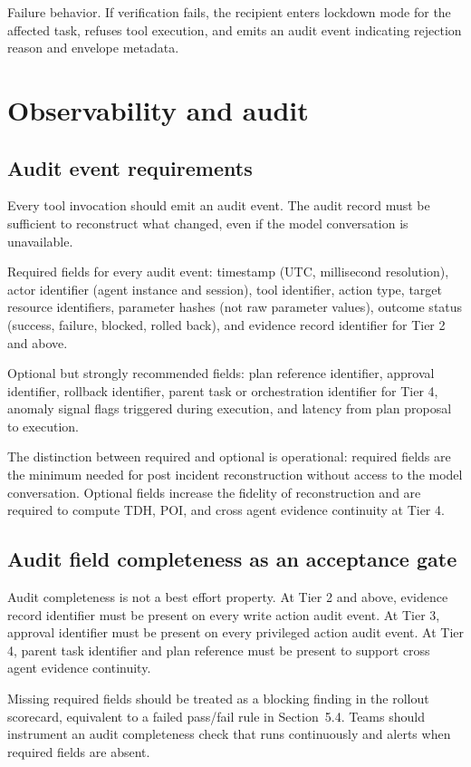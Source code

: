 \documentclass[11pt]{article}
\begin{document}
Failure behavior. If verification fails, the recipient enters lockdown mode for the affected task, refuses tool execution, and emits an audit event indicating rejection reason and envelope metadata.

\section{Observability and audit}

\subsection{Audit event requirements}
Every tool invocation should emit an audit event. The audit record must be sufficient to reconstruct what changed, even if the model conversation is unavailable.

Required fields for every audit event: timestamp (UTC, millisecond resolution), actor identifier (agent instance and session), tool identifier, action type, target resource identifiers, parameter hashes (not raw parameter values), outcome status (success, failure, blocked, rolled back), and evidence record identifier for Tier 2 and above.

Optional but strongly recommended fields: plan reference identifier, approval identifier, rollback identifier, parent task or orchestration identifier for Tier 4, anomaly signal flags triggered during execution, and latency from plan proposal to execution.

The distinction between required and optional is operational: required fields are the minimum needed for post incident reconstruction without access to the model conversation. Optional fields increase the fidelity of reconstruction and are required to compute TDH, POI, and cross agent evidence continuity at Tier 4.

\subsection{Audit field completeness as an acceptance gate}
Audit completeness is not a best effort property. At Tier 2 and above, evidence record identifier must be present on every write action audit event. At Tier 3, approval identifier must be present on every privileged action audit event. At Tier 4, parent task identifier and plan reference must be present to support cross agent evidence continuity.

Missing required fields should be treated as a blocking finding in the rollout scorecard, equivalent to a failed pass/fail rule in Section~5.4. Teams should instrument an audit completeness check that runs continuously and alerts when required fields are absent.
\end{document}

